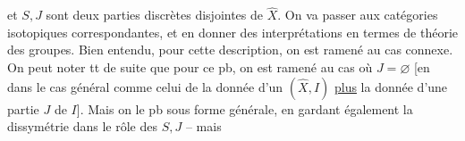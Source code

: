 et $S,J$ sont deux parties discrètes
disjointes de $\widehat X$.
On va  passer aux catégories
isotopiques correspondantes, et
en donner des interprétations
en termes de théorie des groupes.
Bien entendu, pour cette description,
on est ramené au cas connexe.
On peut  noter tt de suite
que pour ce pb, on est ramené
au cas où $J=\varnothing$ [en 
dans le cas général comme celui
de la donnée d'un $(\widehat X,I)$
\uline{plus} la donnée d'une partie $J$
de $I$].
Mais on  le
pb sous  forme générale, en
gardant également la dissymétrie
dans le rôle des $S,J$ -- mais
